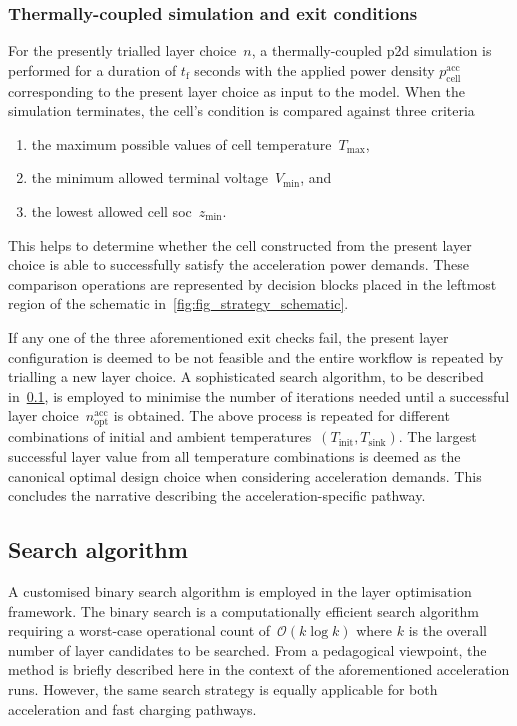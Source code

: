 \subsubsection*{Thermally-coupled  simulation and exit
conditions}\label{sec:accexitconditions}

For  the  presently trialled  layer  choice~$n$,  a thermally-coupled  \gls{p2d}
simulation is performed for a duration  of $t_\text{f}$ seconds with the applied
power  density $p^\text{acc}_\text{cell}$  corresponding  to  the present  layer
choice  as input  to  the  model. When  the  simulation  terminates, the  cell's
condition is compared against three criteria
\begin{enumerate}
    \item the maximum possible values of cell temperature~$T_\text{max}$,
    \item the minimum allowed terminal voltage~$V_\text{min}$, and
    \item the lowest allowed cell \gls{soc}~$z_\text{min}$.
\end{enumerate}
This helps to determine whether the cell constructed from the present layer
choice is able to successfully satisfy the acceleration power demands. These
comparison operations are represented by decision blocks placed in the leftmost
region of the schematic in~\cref{fig:fig_strategy_schematic}.

If  any one  of the  three aforementioned  exit checks  fail, the  present layer
configuration is deemed  to be not feasible and the  entire workflow is repeated
by  trialling a  new  layer  choice. A  sophisticated  search  algorithm, to  be
described  in~\cref{sec:searchalgo},  is  employed  to minimise  the  number  of
iterations needed  until a successful layer  choice~$n_\text{opt}^\text{acc}$ is
obtained. The  above process is  repeated for different combinations  of initial
and  ambient temperatures~\mbox{$(T_\text{init},  T_\text{sink})$}. The  largest
successful  layer value  from  all  temperature combinations  is  deemed as  the
canonical  optimal design  choice  when considering  acceleration demands.  This
concludes the narrative describing the acceleration-specific pathway.

\subsection{Search algorithm}\label{sec:searchalgo}

A  customised binary  search algorithm  is  employed in  the layer  optimisation
framework. The  binary search  is a  computationally efficient  search algorithm
requiring a worst-case operational count of~$\mathcal{O}(k \log k)$ where $k$ is
the  overall number  of  layer candidates  to be  searched.  From a  pedagogical
viewpoint,  the  method  is  briefly  described  here  in  the  context  of  the
aforementioned acceleration runs.  However, the same search  strategy is equally
applicable for both acceleration and fast charging pathways.

